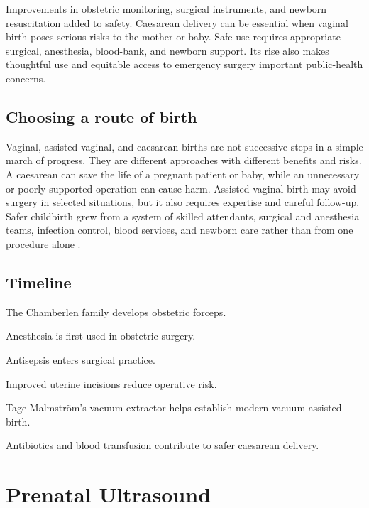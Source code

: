 \documentclass[12pt,oneside]{book}
\begin{document}
Improvements in obstetric monitoring, surgical instruments, and newborn
resuscitation added to safety. Caesarean delivery can be essential when
vaginal birth poses serious risks to the mother or baby. Safe use requires
appropriate surgical, anesthesia, blood-bank, and newborn support. Its rise
also makes thoughtful use and equitable access to emergency surgery important
public-health concerns.

\section{Choosing a route of birth}
Vaginal, assisted vaginal, and caesarean births are not successive steps in a
simple march of progress. They are different approaches with different
benefits and risks. A caesarean can save the life of a pregnant patient or
baby, while an unnecessary or poorly supported operation can cause harm.
Assisted vaginal birth may avoid surgery in selected situations, but it also
requires expertise and careful follow-up. Safer childbirth grew from a system
of skilled attendants, surgical and anesthesia teams, infection control,
blood services, and newborn care rather than from one procedure alone
\cite{caesareanHistory,nlmCaesareanHistory,baskettOperativeDelivery2019}.

\section*{Timeline}
\begin{description}[leftmargin=2.3cm,style=nextline]
  \item[Early seventeenth century] The Chamberlen family develops obstetric forceps.
  \item[1847] Anesthesia is first used in obstetric surgery.
  \item[1880s] Antisepsis enters surgical practice.
  \item[Early twentieth century] Improved uterine incisions reduce operative risk.
  \item[1950s] Tage Malmstr\"om's vacuum extractor helps establish modern vacuum-assisted birth.
  \item[After 1945] Antibiotics and blood transfusion contribute to safer caesarean delivery.
\end{description}
\chapter[Prenatal Ultrasound]{Prenatal Ultrasound}
\end{document}
